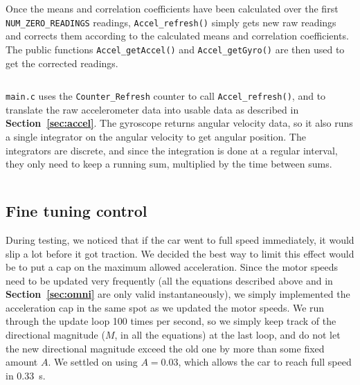 \documentclass[letterpaper, 11pt]{article}
\newcommand*{\secref}[1]{\textbf{Section~\ref{#1}}}
\begin{document}
Once the means and correlation coefficients have been calculated over the first \verb|NUM_ZERO_READINGS| readings, \verb|Accel_refresh()| simply gets new raw readings and corrects them according to the calculated means and correlation coefficients. The public functions \verb|Accel_getAccel()| and \verb|Accel_getGyro()| are then used to get the corrected readings.

\begin{mdframed}[backgroundcolor=bg]
    \inputminted[breaklines]{c}{files/excerpts/Accel_refresh.c}
\end{mdframed}

\verb|main.c| uses the \verb|Counter_Refresh| counter to call \verb|Accel_refresh()|, and to translate the raw accelerometer data into usable data as described in \secref{sec:accel}. The gyroscope returns angular velocity data, so it also runs a single integrator on the angular velocity to get angular position. The integrators are discrete, and since the integration is done at a regular interval, they only need to keep a running sum, multiplied by the time between sums.

\begin{mdframed}[backgroundcolor=bg]
    \inputminted[breaklines]{c}{files/excerpts/accel_gyro_handling.c}
\end{mdframed}

\subsection{Fine tuning control}
During testing, we noticed that if the car went to full speed immediately, it would slip a lot before it got traction. We decided the best way to limit this effect would be to put a cap on the maximum allowed acceleration. Since the motor speeds need to be updated very frequently (all the equations described above and in \secref{sec:omni} are only valid instantaneously), we simply implemented the acceleration cap in the same spot as we updated the motor speeds. We run through the update loop 100 times per second, so we simply keep track of the directional magnitude ($M$, in all the equations) at the last loop, and do not let the new directional magnitude exceed the old one by more than some fixed amount $A$. We settled on using $A = 0.03$, which allows the car to reach full speed in \SI{0.33}{s}.

\begin{mdframed}[backgroundcolor=bg]
    \inputminted[breaklines]{c}{files/excerpts/accelLimit.c}
\end{mdframed}
\end{document}
